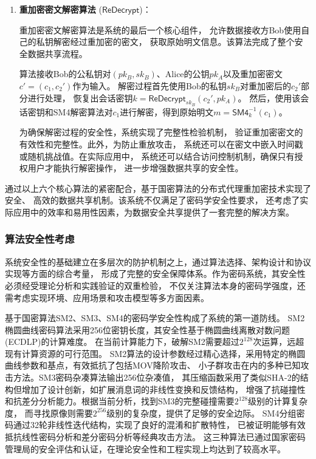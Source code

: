 \begin{enumerate}
	\item \textbf{重加密密文解密算法} ($\mathsf{ReDecrypt}$)：

	      重加密密文解密算法是系统的最后一个核心组件，
	      允许数据接收方Bob使用自己的私钥解密经过重加密的密文，
	      获取原始明文信息。该算法完成了整个安全数据共享流程。

	      算法接收Bob的公私钥对$(pk_B, sk_B)$、Alice的公钥$pk_A$以及重加密密文$c' = (c_1, c_2')$作为输入。
	      解密过程首先使用Bob的私钥$sk_B$对重加密后的$c_2'$部分进行处理，
	      恢复出会话密钥$k = \mathsf{ReDecrypt}_{sk_B}(c_2', pk_A)$。
	      然后，使用该会话密钥和SM4解密算法对$c_1$进行解密，得到原始明文$m = \mathsf{SM4}_k^{-1}(c_1)$。

	      为确保解密过程的安全性，系统实现了完整性检验机制，
	      验证重加密密文的有效性和完整性。此外，为防止重放攻击，
	      系统还可以在密文中嵌入时间戳或随机挑战值。在实际应用中，
	      系统还可以结合访问控制机制，确保只有授权用户才能执行解密操作，
	      进一步增强数据共享的安全性。

\end{enumerate}

通过以上六个核心算法的紧密配合，基于国密算法的分布式代理重加密技术实现了安全、
高效的数据共享机制。该系统不仅满足了密码学安全性要求，
还考虑了实际应用中的效率和易用性因素，为数据安全共享提供了一套完整的解决方案。

\subsubsection{算法安全性考虑}
系统安全性的基础建立在多层次的防护机制之上，通过算法选择、架构设计和协议实现等方面的综合考量，
形成了完整的安全保障体系。作为密码系统，其安全性必须经受理论分析和实践验证的双重检验，
不仅关注算法本身的密码学强度，还需考虑实现环境、应用场景和攻击模型等多方面因素。

基于国密算法SM2、SM3、SM4的密码学安全性构成了系统的第一道防线。
SM2椭圆曲线密码算法采用256位密钥长度，其安全性基于椭圆曲线离散对数问题(ECDLP)的计算难度。
在当前计算能力下，破解SM2需要超过$2^{128}$次运算，远超现有计算资源的可行范围。
SM2算法的设计参数经过精心选择，采用特定的椭圆曲线参数和基点，有效抵抗了包括MOV降阶攻击、
小子群攻击在内的多种已知攻击方法。SM3密码杂凑算法输出256位杂凑值，
其压缩函数采用了类似SHA-2的结构但增加了设计创新，如扩展消息词的非线性变换和反馈结构，
增强了抗碰撞性和抗差分分析能力。根据当前分析，找到SM3的完整碰撞需要$2^{128}$级别的计算复杂度，
而寻找原像则需要$2^{256}$级别的复杂度，提供了足够的安全边际。
SM4分组密码通过32轮非线性迭代结构，实现了良好的混淆和扩散特性，
已被证明能够有效抵抗线性密码分析和差分密码分析等经典攻击方法。
这三种算法已通过国家密码管理局的安全评估和认证，在理论安全性和工程实现上均达到了较高水平。

